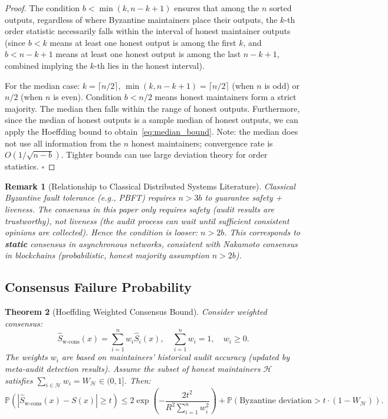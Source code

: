 \documentclass[11pt,a4paper]{article}
\newtheorem{theorem}{Theorem}[section]
\newtheorem{remark}[theorem]{Remark}
\theoremstyle{definition}
\newcommand{\Prob}{\mathbb{P}}
\begin{document}
\begin{proof}
The condition $b < \min(k, n-k+1)$ ensures that among the $n$ sorted outputs, regardless of where Byzantine maintainers place their outputs, the $k$-th order statistic necessarily falls within the interval of honest maintainer outputs (since $b < k$ means at least one honest output is among the first $k$, and $b < n-k+1$ means at least one honest output is among the last $n-k+1$, combined implying the $k$-th lies in the honest interval).

For the median case: $k = \lceil n/2 \rceil$, $\min(k, n-k+1) = \lceil n/2 \rceil$ (when $n$ is odd) or $n/2$ (when $n$ is even). Condition $b < n/2$ means honest maintainers form a strict majority. The median then falls within the range of honest outputs. Furthermore, since the median of honest outputs is a sample median of honest outputs, we can apply the Hoeffding bound to obtain~\eqref{eq:median_bound}. Note: the median does not use all information from the $n$ honest maintainers; convergence rate is $O(1/\sqrt{n-b})$. Tighter bounds can use large deviation theory for order statistics. \hfill$\square$
\end{proof}

\begin{remark}[Relationship to Classical Distributed Systems Literature]
Classical Byzantine fault tolerance (e.g., PBFT) requires $n > 3b$ to guarantee safety + liveness. The consensus in this paper only requires safety (audit results are trustworthy), not liveness (the audit process can wait until sufficient consistent opinions are collected). Hence the condition is looser: $n > 2b$. This corresponds to \textbf{static} consensus in asynchronous networks, consistent with Nakamoto consensus in blockchains (probabilistic, honest majority assumption $n > 2b$).
\end{remark}

\subsection{Consensus Failure Probability}

\begin{theorem}[Hoeffding Weighted Consensus Bound]
\label{thm:weighted_consensus}
Consider weighted consensus:
\begin{equation}\label{eq:weighted_consensus}
    \hat{S}_{\text{w-cons}}(x) = \sum_{i=1}^{n} w_i \hat{S}_i(x), \quad \sum_{i=1}^{n} w_i = 1, \quad w_i \geq 0.
\end{equation}
The weights $w_i$ are based on maintainers' historical audit accuracy (updated by meta-audit detection results). Assume the subset of honest maintainers $\mathcal{H}$ satisfies $\sum_{i \in \mathcal{H}} w_i = W_{\mathcal{H}} \in (0, 1]$. Then:
\begin{equation}\label{eq:weighted_bound}
    \Prob\left(|\hat{S}_{\text{w-cons}}(x) - S(x)| \geq t\right) \leq 2\exp\left(-\frac{2 t^2}{R^2 \sum_{i=1}^{n} w_i^2}\right) + \Prob(\text{Byzantine deviation} > t \cdot (1 - W_{\mathcal{H}})).
\end{equation}
\end{theorem}
\end{document}
